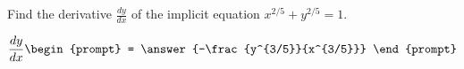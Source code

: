 \documentclass{ximera}
\author{Gregory Hartman \and Matthew Carr}
\begin{document}
\begin{exercise}



Find the derivative $\frac{dy}{dx}$ of the implicit equation $x^{2/5}+y^{2/5}=1$.

\[
\frac{dy}{dx}
\begin{prompt}
= \answer{-\frac{y^{3/5}}{x^{3/5}}}
\end{prompt}
\]

\end{exercise}
\end{document}
